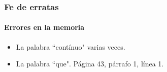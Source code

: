 \begin{frame}
	\frametitle{Fe de erratas}
	\framesubtitle{Errores en la memoria}
	
	\begin{itemize}
		\item La palabra ``cont\'inuo" varias veces.
		\item La palabra ``que". P\'agina 43, p\'arrafo 1, l\'inea 1.
	\end{itemize}
\end{frame}